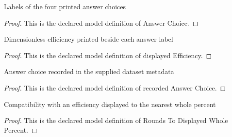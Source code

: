 \begin{definition}
  \label{def:physics:phyx-mini-0480:phyxminiproblems-problemphyxmini0480-answerchoice}
  Labels of the four printed answer choices
\end{definition}
\begin{proof}
  This is the declared model definition of Answer Choice.
\end{proof}
\begin{definition}
  \label{def:physics:phyx-mini-0480:phyxminiproblems-problemphyxmini0480-displayedefficiency}
  Dimensionless efficiency printed beside each answer label
\end{definition}
\begin{proof}
  This is the declared model definition of displayed Efficiency.
\end{proof}
\begin{definition}
  \label{def:physics:phyx-mini-0480:phyxminiproblems-problemphyxmini0480-recordedanswerchoice}
  Answer choice recorded in the supplied dataset metadata
\end{definition}
\begin{proof}
  This is the declared model definition of recorded Answer Choice.
\end{proof}
\begin{definition}
  \label{def:physics:phyx-mini-0480:phyxminiproblems-problemphyxmini0480-roundstodisplayedwholepercent}
  Compatibility with an efficiency displayed to the nearest whole percent
\end{definition}
\begin{proof}
  This is the declared model definition of Rounds To Displayed Whole Percent.
\end{proof}
